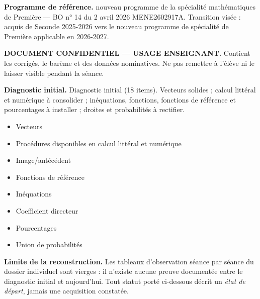 \documentclass[10pt,a4paper]{article}
\begin{document}
\begin{methodbox}\small\textbf{Programme de référence.} nouveau programme de la spécialité mathématiques de Première --- BO n° 14 du 2 avril 2026 MENE2602917A. Transition visée : acquis de Seconde 2025-2026 vers le nouveau programme de spécialité de Première applicable en 2026-2027.\end{methodbox}
\begin{keybox}\textbf{DOCUMENT CONFIDENTIEL --- USAGE ENSEIGNANT.} Contient les corrigés, le barème et des données nominatives. Ne pas remettre à l'élève ni le laisser visible pendant la séance.\end{keybox}
\begin{methodbox}
\textbf{Diagnostic initial.} Diagnostic initial (18 items). Vecteurs solides ; calcul littéral et numérique à consolider ; inéquations, fonctions, fonctions de référence et pourcentages à installer ; droites et probabilités à rectifier.
\end{methodbox}
\begin{itemize}\item Vecteurs\item Procédures disponibles en calcul littéral et numérique\end{itemize}
\begin{itemize}\item Image/antécédent\item Fonctions de référence\item Inéquations\item Coefficient directeur\item Pourcentages\item Union de probabilités\end{itemize}
\begin{warningbox}\textbf{Limite de la reconstruction.} Les tableaux d'observation séance par séance du dossier individuel sont vierges : il n'existe aucune preuve documentée entre le diagnostic initial et aujourd'hui. Tout statut porté ci-dessous décrit un \emph{état de départ}, jamais une acquisition constatée.\end{warningbox}
\newpage{}
\end{document}
